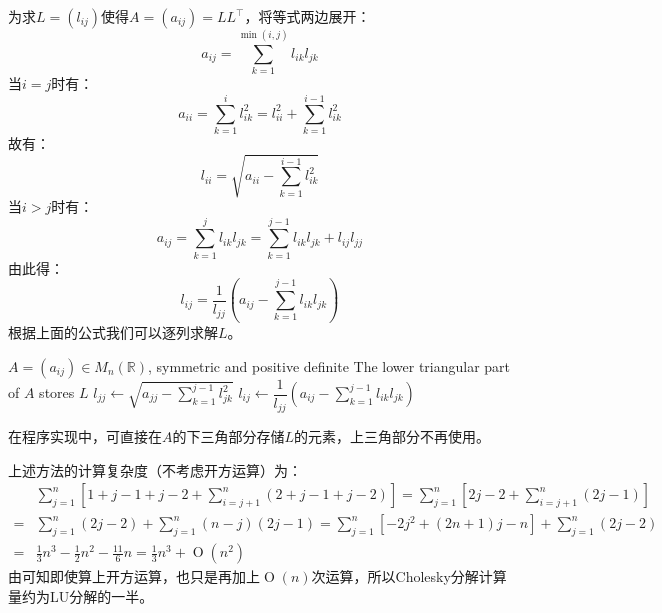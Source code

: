 \begin{method}
	为求$L=(l_{ij})$使得$A=(a_{ij})=LL^{\top}$，将等式两边展开：
	\begin{equation*}
		a_{ij}=\sum_{k=1}^{\min(i,j)}l_{ik}l_{jk}
	\end{equation*}
	当$i=j$时有：
	\begin{equation*}
		a_{ii}=\sum_{k=1}^{i}l_{ik}^2=l_{ii}^2+\sum_{k=1}^{i-1}l_{ik}^2
	\end{equation*}
	故有：
	\begin{equation*}
		l_{ii}=\sqrt{a_{ii}-\sum_{k=1}^{i-1}l_{ik}^2}
	\end{equation*}
	当$i>j$时有：
	\begin{equation*}
		a_{ij}=\sum_{k=1}^{j}l_{ik}l_{jk}=\sum_{k=1}^{j-1}l_{ik}l_{jk}+l_{ij}l_{jj}
	\end{equation*}
	由此得：
	\begin{equation*}
		l_{ij}=\frac{1}{l_{jj}}\left(a_{ij}-\sum_{k=1}^{j-1}l_{ik}l_{jk}\right)
	\end{equation*}
	根据上面的公式我们可以逐列求解$L$。
	\begin{algorithm}[H]
		\caption{Cholesky Factorization (Comparison Method)}
		\label{alg:CholeskyFactorization}
		\begin{algorithmic}[1]
			\Require $A=(a_{ij})\in M_{n}(\mathbb{R})$, symmetric and positive definite
			\Ensure The lower triangular part of $A$ stores $L$
				\State $l_{jj}\gets\sqrt{a_{jj}-\sum\limits_{k=1}^{j-1}l_{jk}^2}$
						\State $l_{ij}\gets\dfrac{1}{l_{jj}}\left(a_{ij}-\sum\limits_{k=1}^{j-1}l_{ik}l_{jk}\right)$
				\EndFor
			\EndFor
		\end{algorithmic}
	\end{algorithm}
	在程序实现中，可直接在$A$的下三角部分存储$L$的元素，上三角部分不再使用。\par
	上述方法的计算复杂度（不考虑开方运算）为：
	\begin{align*}
		&\sum_{j=1}^{n}\left[1+j-1+j-2+\sum_{i=j+1}^{n}(2+j-1+j-2)\right]=\sum_{j=1}^{n}\left[2j-2+\sum_{i=j+1}^{n}(2j-1)\right] \\
		=&\sum_{j=1}^{n}(2j-2)+\sum_{j=1}^{n}(n-j)(2j-1)=\sum_{j=1}^{n}[-2j^2+(2n+1)j-n]+\sum_{j=1}^{n}(2j-2) \\
		=&\frac{1}{3}n^3-\frac{1}{2}n^2-\frac{11}{6}n=\frac{1}{3}n^3+\operatorname{O}(n^2)
	\end{align*}
	由可知即使算上开方运算，也只是再加上$\operatorname{O}(n)$次运算，所以Cholesky分解计算量约为LU分解的一半。
\end{method}


